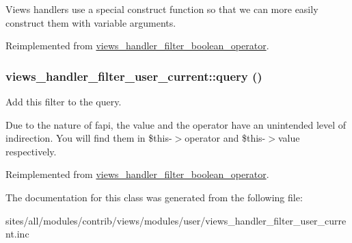 Views handlers use a special construct function so that we can more easily construct them with variable arguments. 

Reimplemented from \hyperlink{classviews__handler__filter__boolean__operator_659352df10ef3144359e90247f450ef2}{views\_\-handler\_\-filter\_\-boolean\_\-operator}.\hypertarget{classviews__handler__filter__user__current_6002cf25d2385bd07c771f9a65cee48f}{
\subsubsection[{query}]{\setlength{\rightskip}{0pt plus 5cm}views\_\-handler\_\-filter\_\-user\_\-current::query ()}}
\label{classviews__handler__filter__user__current_6002cf25d2385bd07c771f9a65cee48f}


Add this filter to the query.

Due to the nature of fapi, the value and the operator have an unintended level of indirection. You will find them in \$this-$>$operator and \$this-$>$value respectively. 

Reimplemented from \hyperlink{classviews__handler__filter__boolean__operator_b3afc650701939c060e684d75fa2b21b}{views\_\-handler\_\-filter\_\-boolean\_\-operator}.

The documentation for this class was generated from the following file:\begin{CompactItemize}
\item 
sites/all/modules/contrib/views/modules/user/views\_\-handler\_\-filter\_\-user\_\-current.inc\end{CompactItemize}
